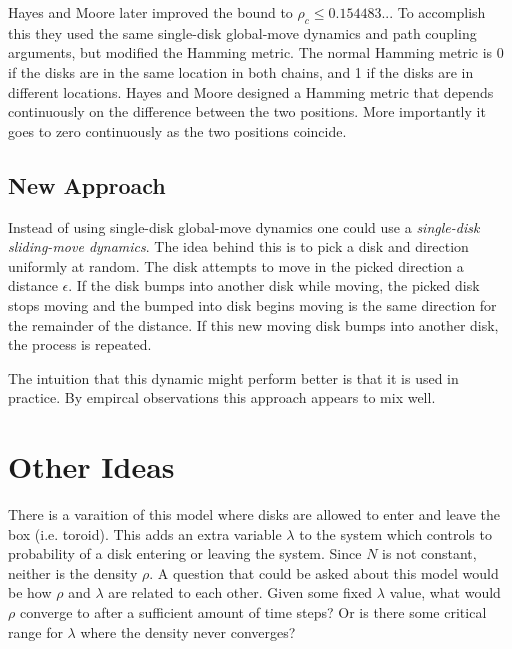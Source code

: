 \documentclass[a4paper,11pt]{article}
\begin{document}
Hayes and Moore \cite{Hayes} later improved the bound to $\rho_c \le 0.154483..$.  To accomplish this they used the same single-disk global-move dynamics and path coupling arguments, but modified the Hamming metric.  The normal Hamming metric is 0 if the disks are in the same location in both chains, and 1 if the disks are in different locations.  Hayes and Moore designed a Hamming metric that depends continuously on the difference between the two positions.  More importantly it goes to zero continuously as the two positions coincide.

\subsection*{New Approach}

Instead of using single-disk global-move dynamics one could use a \textit{single-disk sliding-move dynamics}.  The idea behind this is to pick a disk and direction uniformly at random.  The disk attempts to move in the picked direction a distance $\epsilon$.  If the disk bumps into another disk while moving, the picked disk stops moving and the bumped into disk begins moving is the same direction for the remainder of the distance.  If this new moving disk bumps into another disk, the process is repeated.

The intuition that this dynamic might perform better is that it is used in practice.  By empircal observations this approach appears to mix well.

\section*{Other Ideas}

There is a varaition of this model where disks are allowed to enter and leave the box (i.e. toroid).  This adds an extra variable $\lambda$ to the system which controls to probability of a disk entering or leaving the system.  Since $N$ is not constant, neither is the density $\rho$.  A question that could be asked about this model would be how $\rho$ and $\lambda$ are related to each other.  Given some fixed $\lambda$ value, what would $\rho$ converge to after a sufficient amount of time steps? Or is there some critical range for $\lambda$ where the density never converges?
\end{document}
